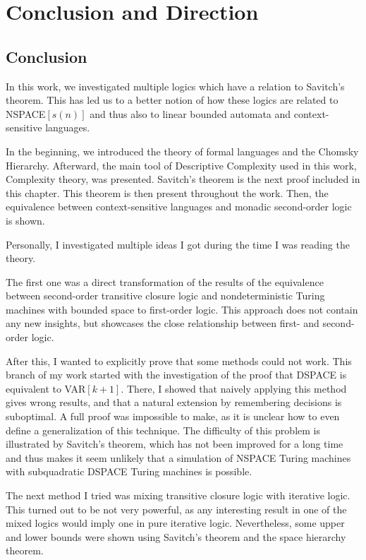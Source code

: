 \chapter{Conclusion and Direction}\label{ch:conclusion-and-direction}

\section{Conclusion}\label{sec:conclusion}
In this work, we investigated multiple logics which have a relation to Savitch's theorem.
This has led us to a better notion of how these logics are related to NSPACE$[s(n)]$ and thus also to linear bounded automata and context-sensitive languages.

In the beginning, we introduced the theory of formal languages and the Chomsky Hierarchy.
Afterward, the main tool of Descriptive Complexity used in this work, Complexity theory, was presented.
Savitch's theorem is the next proof included in this chapter.
This theorem is then present throughout the work.
Then, the equivalence between context-sensitive languages and monadic second-order logic is shown.

Personally, I investigated multiple ideas I got during the time I was reading the theory.

The first one was a direct transformation of the results of the equivalence between second-order transitive closure logic and nondeterministic Turing machines with bounded space to first-order logic.
This approach does not contain any new insights, but showcases the close relationship between first- and second-order logic.

After this, I wanted to explicitly prove that some methods could not work.
This branch of my work started with the investigation of the proof that DSPACE is equivalent to VAR$[k + 1]$.
There, I showed that naively applying this method gives wrong results, and that a natural extension by remembering decisions is suboptimal.
A full proof was impossible to make, as it is unclear how to even define a generalization of this technique.
The difficulty of this problem is illustrated by Savitch's theorem, which has not been improved for a long time and thus makes it seem unlikely that a simulation of NSPACE Turing machines with subquadratic DSPACE Turing machines is possible.

The next method I tried was mixing transitive closure logic with iterative logic.
This turned out to be not very powerful, as any interesting result in one of the mixed logics would imply one in pure iterative logic.
Nevertheless, some upper and lower bounds were shown using Savitch's theorem and the space hierarchy theorem.

